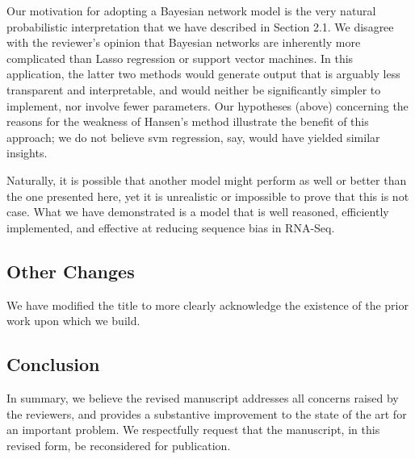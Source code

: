 \documentclass{article}
\begin{document}
Our motivation for adopting a Bayesian network model is the very
natural probabilistic interpretation that we have described in Section
2.1. We disagree with the reviewer's opinion that Bayesian networks
are inherently more complicated than Lasso regression or support
vector machines.  In this application, the latter two methods would
generate output that is arguably less transparent and interpretable,
and would neither be significantly simpler to implement, nor involve
fewer parameters.  Our hypotheses (above) concerning the reasons for
the weakness of Hansen's method illustrate the benefit of this
approach; we do not believe svm regression, say, would have yielded
similar insights.

Naturally, it is possible that another model might perform as well or better
than the one presented here, yet it is unrealistic or impossible to prove that
this is not case. What we have demonstrated is a model that is well reasoned,
efficiently implemented, and effective at reducing sequence bias in RNA-Seq.


\subsection*{Other Changes}

We have modified the title to more clearly acknowledge the existence of
the prior work upon which we build.


\subsection*{Conclusion}
In summary, we believe the revised manuscript addresses all concerns
raised by the reviewers, and provides a substantive improvement to the
state of the art for an important problem.  We respectfully request
that the manuscript, in this revised form, be reconsidered for
publication.
\end{document}

